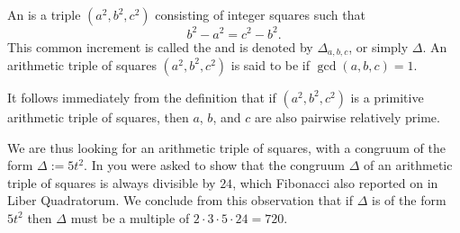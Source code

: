 \begin{definition}
  An  is a triple $(a^2,b^2,c^2)$ consisting of integer squares such that
  \begin{equation*}
    b^2-a^2=c^2-b^2.
  \end{equation*}
  This common increment is called the  and is denoted by $\Delta_{a,b,c}$, or simply $\Delta$. An arithmetic triple of squares $(a^2,b^2,c^2)$ is said to be  if $\gcd(a,b,c)=1$.
\end{definition}

It follows immediately from the definition that if $(a^2,b^2,c^2)$ is a primitive arithmetic triple of squares, then $a$, $b$, and $c$ are also pairwise relatively prime.

We are thus looking for an arithmetic triple of squares, with a congruum of the form $\Delta:=5t^2$. In  you were asked to show that the congruum $\Delta$ of an arithmetic triple of squares is always divisible by $24$, which Fibonacci also reported on in Liber Quadratorum. We conclude from this observation that if $\Delta$ is of the form $5t^2$ then $\Delta$ must be a multiple of $2\cdot3\cdot 5 \cdot 24=720$.

